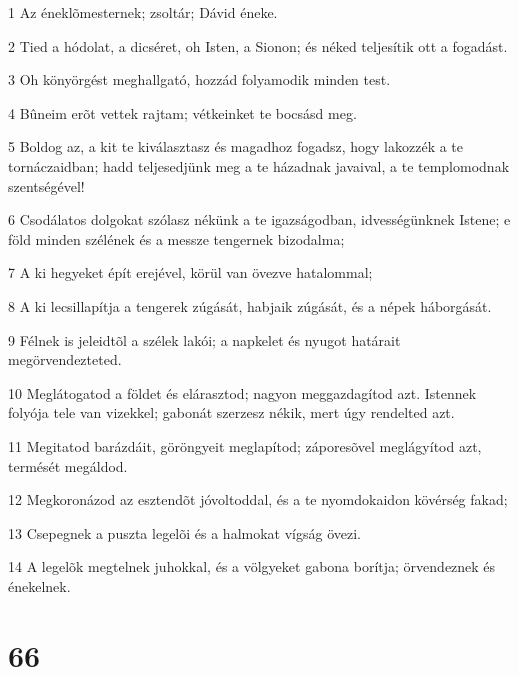 \par 1 Az éneklõmesternek; zsoltár; Dávid éneke.
\par 2 Tied a hódolat, a dicséret, oh Isten, a Sionon; és néked teljesítik ott a fogadást.
\par 3 Oh könyörgést meghallgató, hozzád folyamodik minden test.
\par 4 Bûneim erõt vettek rajtam; vétkeinket te bocsásd meg.
\par 5 Boldog az, a kit te kiválasztasz és magadhoz fogadsz, hogy lakozzék a te tornáczaidban; hadd teljesedjünk meg a te házadnak javaival, a te templomodnak szentségével!
\par 6 Csodálatos dolgokat szólasz nékünk a te igazságodban, idvességünknek Istene; e föld minden szélének és a messze tengernek bizodalma;
\par 7 A ki hegyeket épít erejével, körül van övezve hatalommal;
\par 8 A ki lecsillapítja a tengerek zúgását, habjaik zúgását, és a népek háborgását.
\par 9 Félnek is jeleidtõl a szélek lakói; a napkelet és nyugot határait megörvendezteted.
\par 10 Meglátogatod a földet és elárasztod; nagyon meggazdagítod azt. Istennek folyója tele van vizekkel; gabonát szerzesz nékik, mert úgy rendelted azt.
\par 11 Megitatod barázdáit, göröngyeit meglapítod; záporesõvel meglágyítod azt, termését megáldod.
\par 12 Megkoronázod az esztendõt jóvoltoddal, és a te nyomdokaidon kövérség fakad;
\par 13 Csepegnek a puszta legelõi és a halmokat vígság övezi.
\par 14 A legelõk megtelnek juhokkal, és a völgyeket gabona borítja; örvendeznek és énekelnek.

\chapter{66}

